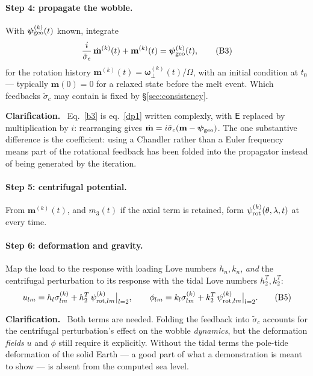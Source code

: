 \documentclass[11pt,a4paper]{article}
\newcommand{\bw}{\bm{\omega}}
\newcommand{\E}{\mathsf{E}}
\renewenvironment{leftbar}{%
  \def\FrameCommand{{\color{clarbar}\vrule width 2.5pt}\hspace{8pt}}%
  \MakeFramed{\advance\hsize-\width\FrameRestore}}%
  {\endMakeFramed}
\newenvironment{clar}{\begin{leftbar}\small\noindent\textbf{Clarification.}\ }{\end{leftbar}}
\begin{document}
\paragraph{Step 4: propagate the wobble.} With $\bm\psi^{(k)}_{\rm geo}(t)$ known, integrate
\begin{equation}
  \frac{i}{\tilde\sigma_c}\,\dot{\mathbf{m}}^{(k)}(t)+\mathbf{m}^{(k)}(t)=\bm\psi^{(k)}_{\rm geo}(t),
  \tag{B3}\label{b3}
\end{equation}
for the rotation history $\mathbf{m}^{(k)}(t)=\bw^{(k)}_\perp(t)/\Omega$, with an initial condition at
$t_0$ --- typically $\mathbf{m}(0)=0$ for a relaxed state before the melt event. Which feedbacks
$\tilde\sigma_c$ may contain is fixed by \S\ref{sec:consistency}.

\begin{clar}
Eq.~\eqref{b3} is eq.~\eqref{dp1} written complexly, with $\E$ replaced by multiplication by $i$:
rearranging gives $\dot{\mathbf{m}}=i\tilde\sigma_c(\mathbf{m}-\bm\psi_{\rm geo})$. The one
substantive difference is the coefficient: using a Chandler rather than a Euler frequency means part
of the rotational feedback has been folded into the propagator instead of being generated by the
iteration.
\end{clar}

\paragraph{Step 5: centrifugal potential.} From $\mathbf{m}^{(k)}(t)$, and $m_3(t)$ if the axial term
is retained, form $\psi^{(k)}_{\rm rot}(\theta,\lambda,t)$ at every time.

\paragraph{Step 6: deformation and gravity.} Map the load to the response with loading Love numbers
$h_n,k_n$, \emph{and} the centrifugal perturbation to its response with the tidal Love numbers
$h^T_2,k^T_2$:
\begin{equation}
  u_{lm}=h_l\sigma^{(k)}_{lm}+h^T_2\,\psi^{(k)}_{{\rm rot},lm}\big|_{l=2},\qquad
  \phi_{lm}=k_l\sigma^{(k)}_{lm}+k^T_2\,\psi^{(k)}_{{\rm rot},lm}\big|_{l=2}.
  \tag{B5}\label{b5}
\end{equation}

\begin{clar}
Both terms are needed. Folding the feedback into $\tilde\sigma_c$ accounts for the centrifugal
perturbation's effect on the wobble \emph{dynamics}, but the deformation \emph{fields} $u$ and
$\phi$ still require it explicitly. Without the tidal terms the pole-tide deformation of the solid
Earth --- a good part of what a demonstration is meant to show --- is absent from the computed sea
level.
\end{clar}
\end{document}
